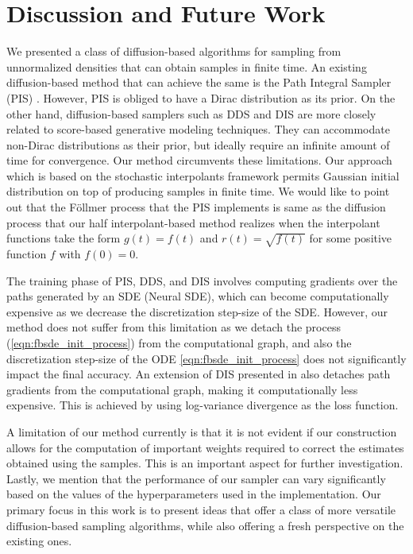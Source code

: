 \section{Discussion and Future Work}\label{sec:discussion}
We presented a class of diffusion-based algorithms for sampling from unnormalized densities that can obtain samples in finite time. An existing diffusion-based method that can achieve the same is the Path Integral Sampler (PIS) \cite{zhang_path_2022}. However, PIS is obliged to have a Dirac distribution as its prior. On the other hand, diffusion-based samplers such as DDS \cite{vargas_denoising_2022} and DIS \cite{berner_optimal_2023} are more closely related to score-based generative modeling techniques. They can accommodate non-Dirac distributions as their prior, but ideally require an infinite amount of time for convergence. Our method circumvents these limitations.  Our approach which is based on the stochastic interpolants framework permits Gaussian initial distribution on top of producing samples in finite time. We would like to point out that the F\"ollmer process that the PIS implements is same as the diffusion process that our half interpolant-based method realizes when the interpolant functions take the form $g(t)= f(t)$ and $r(t) = \sqrt{f(t)}$ for some positive function $f$ with $f(0)=0$.

The training phase of PIS, DDS, and DIS involves computing gradients over the paths generated by an SDE (Neural SDE), which can become computationally expensive as we decrease the discretization step-size of the SDE. However, our method does not suffer from this limitation as we detach the process (\ref{eqn:fbsde_init_process}) from the computational graph, and also the discretization step-size of the ODE \ref{eqn:fbsde_init_process} does not significantly impact the final accuracy. An extension of DIS presented in \cite{richter_improved_2023} also detaches path gradients from the computational graph, making it computationally less expensive. This is achieved by using log-variance divergence as the loss function.

A limitation of our method currently is that it is not evident if our construction allows for the computation of important weights required to correct the estimates obtained using the samples. This is an important aspect for further investigation. Lastly, we mention that the performance of our sampler can vary significantly based on the values of the hyperparameters used in the implementation. Our primary focus in this work is to present ideas that offer a class of more versatile diffusion-based sampling algorithms, while also offering a fresh perspective on the existing ones. 


 